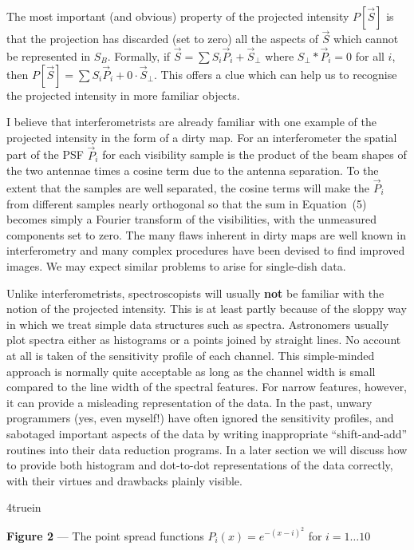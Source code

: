 The most important (and obvious) property of the projected intensity 
$P[\vec S]$ is that the projection has discarded (set to zero) all the 
aspects of $\vec S$ which cannot be represented in $S_B$. Formally, if
$ \vec S = \sum S_i \vec P_i + \vec S_{\perp}$ where $S_{\perp} 
\ast \vec P_i = 0$ for all $i$, then $P[\vec S] = \sum S_i \vec P_i + 0 
\cdot \vec S_{\perp}$. This offers a clue which can help us to recognise
the projected intensity in  more familiar objects.

I believe that interferometrists are already familiar with one example of 
the projected intensity in the form of a dirty map. For an interferometer 
the spatial part of the PSF $\vec P_i$ for each visibility sample is 
the product of the beam shapes of the two antennae times a cosine term 
due to the antenna separation. To the extent that the samples are well 
separated, the cosine terms will make the $\vec P_i$ from different 
samples nearly orthogonal so that the sum 
in Equation~(5) becomes simply a Fourier transform of the visibilities, with 
the unmeasured components set to zero. The many flaws inherent in dirty 
maps are well known in interferometry and many complex procedures have been 
devised to find improved images. We may expect similar problems to arise for 
single-dish data.

Unlike interferometrists, spectroscopists will usually {\bf not} be 
familiar with the notion of the projected intensity. This is at least
partly because of the sloppy way in which we treat simple data structures
such as spectra. Astronomers usually plot spectra 
either as histograms or a points joined by straight lines. No account at 
all is taken of the sensitivity profile of each channel. This simple-minded
approach is 
normally quite acceptable as long as the channel width is small compared 
to the line width of the spectral features. For narrow features, however, it 
can provide a misleading representation of the data.  In the past, unwary 
programmers (yes, even myself!) have often ignored the sensitivity profiles, 
and sabotaged important aspects of the data by writing inappropriate 
``shift-and-add'' routines into their data reduction programs. In a later 
section we will discuss how to provide both histogram and 
dot-to-dot representations of the data correctly, with their virtues and 
drawbacks plainly visible. 

\epsfxsize 4truein
\centerline {}
\centerline {{\bf Figure 2} --- The point spread functions 
$P_i(x) = e^{-(x-i)^2}$ for $i = 1 \ldots 10$}

